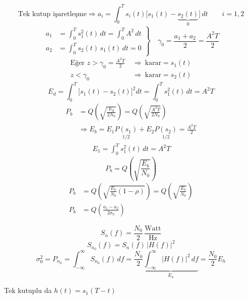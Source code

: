 \documentclass[11pt,a4paper]{article}
\begin{document}
\[ \text{Tek kutup işaretleşme} \Rightarrow a_i = \int_0^T s_i(t)\bigl[s_1(t)-\underbrace{s_2(t)}_{0}\bigr]\,dt \qquad i=1,2 \]
\[
\left.\begin{aligned}
a_1 &= \int_0^T s_1^2(t)\,dt = \int_0^T A^2\,dt\\
a_2 &= \int_0^T s_2(t)\,s_1(t)\,dt = 0
\end{aligned}\right\}
\quad \gamma_0 = \frac{a_1+a_2}{2} = \frac{A^2T}{2}
\]
\begin{align*}
\text{Eğer } z > \gamma_0 = \tfrac{A^2T}{2} &\ \Rightarrow\ \text{karar} = s_1(t)\\
z < \gamma_0 &\ \Rightarrow\ \text{karar} = s_2(t)
\end{align*}
\[ E_d = \int_0^T \bigl[s_1(t)-s_2(t)\bigr]^2 dt = \int_0^T s_1^2(t)\,dt = A^2T \]
\begin{align*}
P_b &= Q\!\left(\sqrt{\frac{E_d}{2N_0}}\right) = Q\!\left(\sqrt{\frac{A^2T}{2N_0}}\right)\\
&\Rightarrow E_b = E_1\underset{1/2}{P(s_1)} + E_2\underset{1/2}{P(s_2)} = \frac{A^2T}{2}\\
&\qquad E_1 = \int_0^T s_1^2(t)\,dt = A^2T
\end{align*}
\[ P_b = Q\!\left(\sqrt{\frac{E_b}{N_0}}\right) \]
\begin{align*}
P_b &= Q\!\left(\sqrt{\frac{E_b}{N_0}(1-\rho)}\right) = Q\!\left(\sqrt{\frac{E_b}{N_0}}\right)\\
P_b &= Q\!\left(\frac{a_1-a_2}{2\sigma_0}\right)
\end{align*}

\begin{center}
\end{center}

\[ S_n(f) = \frac{N_0}{2}\,\frac{\text{Watt}}{\text{Hz}} \]
\[ S_{n_0}(f) = S_n(f)\,|H(f)|^2 \]
\[ \sigma_0^2 = P_{n_0} = \int_{-\infty}^{\infty} S_{n_0}(f)\,df = \frac{N_0}{2}\underbrace{\int_{-\infty}^{\infty}|H(f)|^2\,df}_{E_h} = \frac{N_0}{2}E_h \]

\noindent Tek kutuplu da $h(t)=s_1(T-t)$
\end{document}
